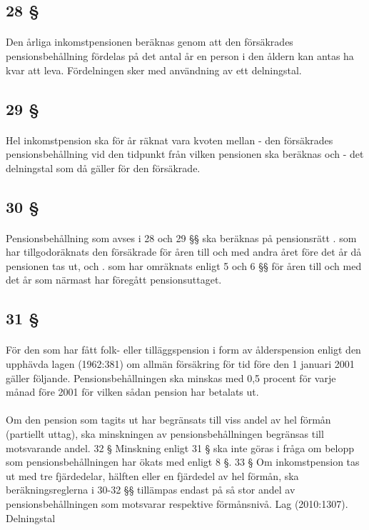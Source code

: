 \documentclass[a4paper,notitlepage,openany,10pt]{book}
\begin{document}
\subsection*{28 §}
\paragraph*{}
Den årliga inkomstpensionen beräknas genom att den försäkrades pensionsbehållning fördelas på det antal år en person i den åldern kan antas ha kvar att leva. Fördelningen sker med användning av ett delningstal.
\subsection*{29 §}
\paragraph*{}
Hel inkomstpension ska för år räknat vara kvoten mellan
\newline - den försäkrades pensionsbehållning vid den tidpunkt från vilken pensionen ska beräknas och - det delningstal som då gäller för den försäkrade.
\subsection*{30 §}
\paragraph*{}
Pensionsbehållning som avses i 28 och 29 §§ ska beräknas på pensionsrätt
. som har tillgodoräknats den försäkrade för åren till och med andra året före det år då pensionen tas ut, och
. som har omräknats enligt 5 och 6 §§ för åren till och med det år som närmast har föregått pensionsuttaget.
\subsection*{31 §}
\paragraph*{}
För den som har fått folk- eller tilläggspension i form av ålderspension enligt den upphävda lagen (1962:381) om allmän försäkring för tid före den 1 januari 2001 gäller följande. Pensionsbehållningen ska minskas med 0,5 procent för varje månad före 2001 för vilken sådan pension har betalats ut.
\paragraph*{}
Om den pension som tagits ut har begränsats till viss andel av hel förmån (partiellt uttag), ska minskningen av pensionsbehållningen begränsas till motsvarande andel. 32 § Minskning enligt 31 § ska inte göras i fråga om belopp som pensionsbehållningen har ökats med enligt 8 §. 33 § Om inkomstpension tas ut med tre fjärdedelar, hälften eller en fjärdedel av hel förmån, ska beräkningsreglerna i 30-32 §§ tillämpas endast på så stor andel av pensionsbehållningen som motsvarar respektive förmånsnivå.
Lag (2010:1307).
Delningstal
\end{document}
